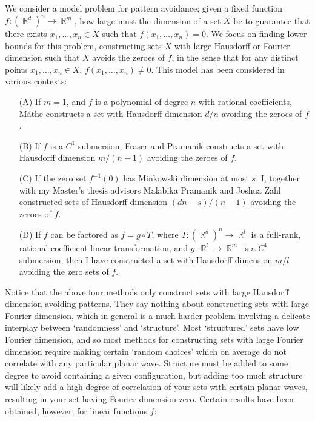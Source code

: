 \documentclass[11pt]{article}
\DeclareMathOperator{\RR}{\mathbb{R}}
\begin{document}
We consider a model problem for pattern avoidance; given a fixed function $f: (\RR^d)^n \to \RR^m$, how large must the dimension of a set $X$ be to guarantee that there exists $x_1,\dots,x_n \in X$ such that $f(x_1,\dots,x_n) = 0$. We focus on finding lower bounds for this problem, constructing sets $X$ with large Hausdorff or Fourier dimension such that $X$ avoids the zeroes of $f$, in the sense that for any distinct points $x_1,\dots,x_n \in X$, $f(x_1,\dots,x_n) \neq 0$. This model has been considered in various contexts:
%
\begin{itemize}
	\item[(A)] If $m = 1$, and $f$ is a polynomial of degree $n$ with rational coefficients, M\'{a}the \cite{Mathe} constructs a set with Hausdorff dimension $d/n$ avoiding the zeroes of $f$.

	\item[(B)] If $f$ is a $C^1$ submersion, Fraser and Pramanik \cite{FraserPramanik} constructs a set with Hausdorff dimension $m/(n-1)$ avoiding the zeroes of $f$. 

	\item[(C)] If the zero set $f^{-1}(0)$ has Minkowski dimension at most $s$, I, together with my Master's thesis advisors Malabika Pramanik and Joshua Zahl \cite{DensonPramanikZahl} constructed sets of Hausdorff dimension $(dn - s)/(n-1)$ avoiding the zeroes of $f$.

	\item[(D)] If $f$ can be factored as $f = g \circ T$, where $T: (\RR^d)^n \to \RR^l$ is a full-rank, rational coefficient linear transformation, and $g: \RR^l \to \RR^m$ is a $C^1$ submersion, then I \cite{DensonCharacterization} have constructed a set with Hausdorff dimension $m/l$ avoiding the zero sets of $f$.
\end{itemize}
%
Notice that the above four methods only construct sets with large Hausdorff dimension avoiding patterns. They say nothing about constructing sets with large Fourier dimension, which in general is a much harder problem involving a delicate interplay between `randomness' and `structure'. Most `structured' sets have low Fourier dimension,%
and so most methods for constructing sets with large Fourier dimension require making certain `random choices' which on average do not correlate with any particular planar wave. Structure must be added to some degree to avoid containing a given configuration, but adding too much structure will likely add a high degree of correlation of your sets with certain planar waves, resulting in your set having Fourier dimension zero. Certain results have been obtained, however, for linear functions $f$:
\end{document}
